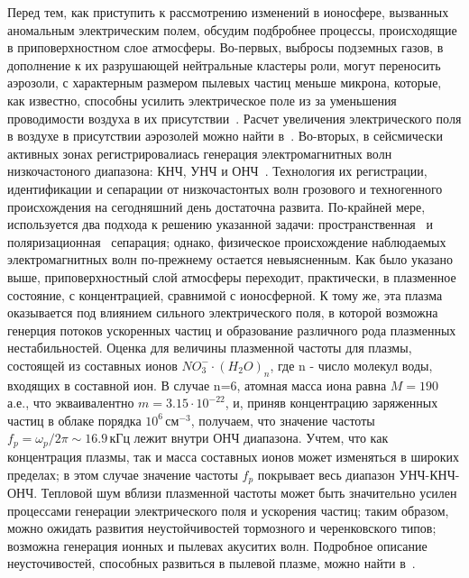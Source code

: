\documentclass[12pt, oneside, a4paper]{article}
\begin{document}
Перед тем, как приступить к рассмотрению изменений в ионосфере, вызванных аномальным электрическим полем, обсудим подбробнее процессы, происходящие в приповерхностном слое атмосферы. Во-первых, выбросы подземных газов, в дополнение к их разрушающей нейтральные кластеры роли, могут переносить аэрозоли, с характерным размером пылевых частиц меньше микрона, которые, как известно, способны усилить электрическое поле из за уменьшения проводимости воздуха в их присутствии~\cite{Krider_Roble:1986}. Расчет увеличения электрического поля в воздухе в присутствии аэрозолей можно найти в~\cite{Pulinets:2000}. Во-вторых, в сейсмически активных зонах регистрировалиась генерация электромагнитных волн низкочастоного диапазона: КНЧ, УНЧ и ОНЧ~\cite{Nagao:2002}.  Технология их регистрации, идентификации и сепарации от низкочастонтых волн грозового и техногенного происхождения на сегодняшний день достаточна развита. По-крайней мере, используется два подхода к решению указанной задачи: пространственная~\cite{Ismaguilov:2001} и поляризационная~\cite{Hattori:2002} сепарация; однако, физическое происхождение наблюдаемых электромагнитных волн по-прежнему остается невыясненным. Как было указано выше, приповерхностный слой атмосферы переходит, практически, в плазменное состояние, с концентрацией, сравнимой с ионосферной.  К тому же, эта плазма оказывается под влиянием сильного электрического поля, в которой возможна генерция потоков ускоренных частиц и образование различного рода плазменных нестабильностей. Оценка для величины плазменной частоты для плазмы, состоящей из составных ионов $NO^-_3\cdot{}(H_2O)_n$, где n - число молекул воды, входящих в составной ион. В случае n=6, атомная масса иона равна $M=190$\,а.е., что экваивалентно $m=3.15\cdot{}10^{-22}$, и, приняв концентрацию заряженных частиц в облаке порядка $10^6$\,см$^{-3}$, получаем, что значение частоты $f_p=\omega_p/2\pi\sim{}16.9$\,кГц лежит внутри ОНЧ диапазона. Учтем, что как концентрация плазмы, так и масса составных ионов может изменяться в широких пределах; в этом случае значение частоты $f_p$ покрывает весь диапазон УНЧ-КНЧ-ОНЧ. Тепловой шум вблизи плазменной частоты может быть значительно усилен процессами генерации электрического поля и ускорения частиц; таким образом, можно ожидать развития неустойчивостей тормозного и черенковского типов; возможна генерация ионных и пылевах акуситих волн. Подробное описание неусточивостей, способных развиться в пылевой плазме, можно найти в~\cite{Kikuchi:2001}. 
\end{document}
